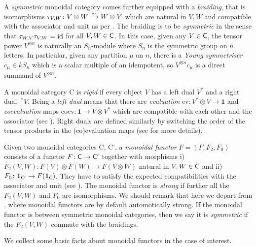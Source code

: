 \documentclass[12pt]{amsart}
\begin{document}
A {\em symmetric} monoidal category comes further equipped with a {\em braiding}, that is isomorphisms $\tau_{V,W} \colon V \otimes W \xrightarrow{\sim} W \otimes V$ which are natural in $V,W$ and compatible with the associator and unit as per \cite[XI.1.(6),(7)]{MacL}. The braiding is to be {\em symmetric} in the sense that $\tau_{W,V} \tau_{V,W} = \operatorname{id}$ for all $V, W \in {\sf C}$. In this case, given any $V \in {\sf C}$, the tensor power $V^{\otimes n}$ is naturally an $S_n$-module where $S_n$ is the symmetric group on $n$ letters. In particular, given any partition $\mu$ on $n$, there is a {\em Young symmetriser} $c_{\mu} \in kS_n$ which is a scalar multiple of an idempotent, so $V^{\otimes n}c_{\mu}$ is a direct summand of $V^{\otimes n}$.

A monoidal category {\sf C} is {\em rigid}  if every object $V$ has a left dual $V^*$ and a right dual $\ ^*V$. Being a {\em left dual} means that there are {\em evaluation} $\text{ev} \colon V^* \otimes V \to \mathbf{1}$ and {\em coevaluation} maps $\text{coev} \colon \mathbf{1} \to V \otimes V^*$ which are compatible with each other and the associator (see \cite[(2.43),(2.44)]{EGNO}). Right duals are defined similarly by switching the order of the  tensor products in the (co)evaluation maps (see \cite[Section~2.10]{EGNO} for more details).

Given two monoidal categories {\sf C, C'}, a {\em monoidal functor} $F = (F,F_2,F_0)$ consists of a functor $F \colon {\sf C} \to {\sf C'}$ together with morphisms i) $F_2(V,W) \colon F(V) \otimes F(W) \to F(V \otimes W)$ natural in $V,W \in {\sf C}$ and ii) $F_0 \colon \mathbf{1}_{\sf C'} \to F(\mathbf{1}_{\sf C})$. They have to satisfy the expected compatibilities with the associator and unit (see \cite[XI.2]{MacL}). The monoidal functor is {\em strong} if further all the $F_2(V,W)$ and $F_0$ are isomorphisms. We should remark that here we depart from \cite{EGNO}, where monoidal functors are by default automotically strong. If the monoidal functor is between symmetric monoidal categories, then we say it is {\em symmetric} if the $F_2(V,W)$ commute with the braidings. 

We collect some basic facts about monoidal functors in the case of interest.
\end{document}

